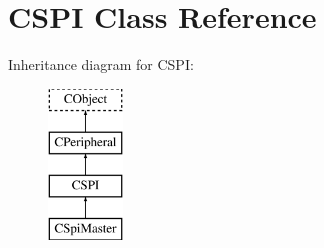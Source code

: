 \hypertarget{class_c_s_p_i}{\section{C\-S\-P\-I Class Reference}
\label{class_c_s_p_i}
}
Inheritance diagram for C\-S\-P\-I\-:\begin{figure}[H]
\begin{center}
\leavevmode
\includegraphics[height=4.000000cm]{class_c_s_p_i}
\end{center}
\end{figure}
